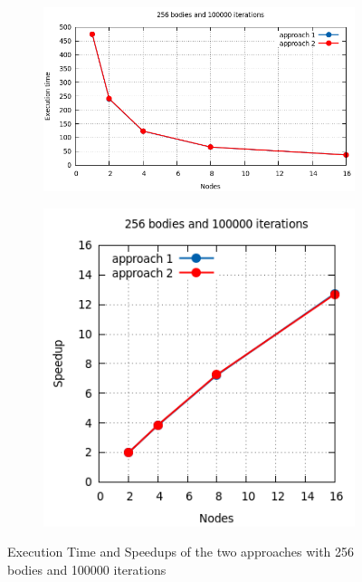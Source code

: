 \documentclass[a4paper]{article}
\begin{document}
\begin{figure}[ht]
\begin{subfigure}{.55\textwidth}
  \centering
  \includegraphics[width=1\linewidth]{results/256_100000_app}
\end{subfigure} %
\begin{subfigure}{.35\textwidth}
  \centering
  \includegraphics[width=1\linewidth]{results/256_100000_app_sp}
\end{subfigure} 
  \caption{Execution Time and Speedups of the two approaches with 256 bodies and 100000 iterations}
  \label{fig:G1}
\end{figure}
\FloatBarrier
\end{document}
